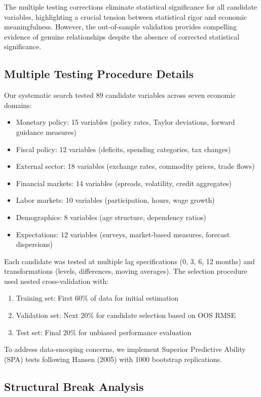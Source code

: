\documentclass[12pt]{article}
\begin{document}
The multiple testing corrections eliminate statistical significance for all candidate variables, highlighting a crucial tension between statistical rigor and economic meaningfulness. However, the out-of-sample validation provides compelling evidence of genuine relationships despite the absence of corrected statistical significance.

\subsection{Multiple Testing Procedure Details}

Our systematic search tested 89 candidate variables across seven economic domains:
\begin{itemize}
\item Monetary policy: 15 variables (policy rates, Taylor deviations, forward guidance measures)
\item Fiscal policy: 12 variables (deficits, spending categories, tax changes)
\item External sector: 18 variables (exchange rates, commodity prices, trade flows)
\item Financial markets: 14 variables (spreads, volatility, credit aggregates)
\item Labor markets: 10 variables (participation, hours, wage growth)
\item Demographics: 8 variables (age structure, dependency ratios)
\item Expectations: 12 variables (surveys, market-based measures, forecast dispersions)
\end{itemize}

Each candidate was tested at multiple lag specifications (0, 3, 6, 12 months) and transformations (levels, differences, moving averages). The selection procedure used nested cross-validation with:
\begin{enumerate}
\item Training set: First 60\% of data for initial estimation
\item Validation set: Next 20\% for candidate selection based on OOS RMSE
\item Test set: Final 20\% for unbiased performance evaluation
\end{enumerate}

To address data-snooping concerns, we implement Superior Predictive Ability (SPA) tests following Hansen (2005) with 1000 bootstrap replications.

\subsection{Structural Break Analysis}
\end{document}
